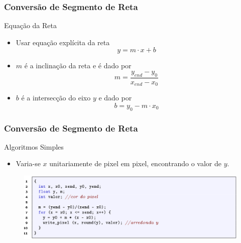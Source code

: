 \documentclass{beamer}
\begin{document}
\begin{frame}
\frametitle{Conversão de Segmento de Reta}

		\begin{block}{Equação da Reta}
		\begin{itemize}
			\item Usar equação explícita da reta
			\begin{equation*}
				y = m \cdot x + b
			\end{equation*}
			\item $m$ é a inclinação da reta e é dado por
			\begin{equation*}
				m = \frac{y_{end} - y_0}{x_{end} - x_0}
			\end{equation*}
			\item $b$ é a intersecção do eixo $y$ e dado por
			\begin{equation*}
				b = y_0 - m\cdot x_0
			\end{equation*}
		\end{itemize}
	\end{block}
	
\end{frame}

\begin{frame}
\frametitle{Conversão de Segmento de Reta}

		\begin{block}{Algoritmos Simples}
		\begin{itemize}
			\item Varia-se $x$ unitariamente de pixel em pixel, encontrando o valor de $y$.
		\end{itemize}
	\end{block}
	
	\begin{figure}[!h]
			\begin{center}
			\includegraphics[width=1\textwidth]{Figures/Cod}
			\end{center}
		\end{figure}
	
\end{frame}
\end{document}
